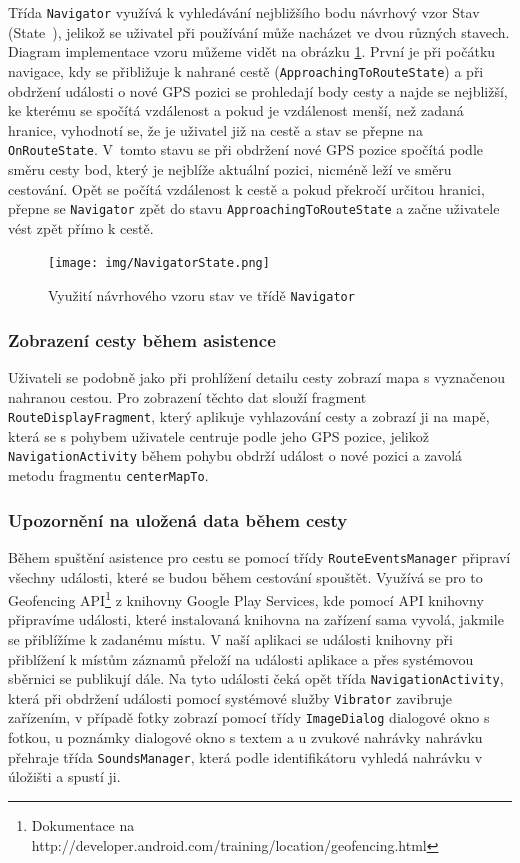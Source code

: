 \documentclass[czech,master,public,dept460,male,java,cpdeclaration]{diploma}
\begin{document}
Třída \texttt{Navigator} využívá k vyhledávání nejbližšího bodu návrhový vzor Stav (State~\cite{designpatterns}), jelikož
se uživatel při používání může nacházet ve dvou různých stavech. Diagram implementace vzoru můžeme vidět
na obrázku \ref{fig:navigatorstate}. První je při počátku navigace,
kdy se přibližuje k nahrané cestě (\texttt{ApproachingToRouteState}) a při obdržení události o nové
GPS pozici se prohledají body cesty a najde se nejbližší, ke kterému se spočítá vzdálenost a pokud
je vzdálenost menší, než zadaná hranice, vyhodnotí se, že je uživatel již na cestě a stav se přepne
na \texttt{OnRouteState}.
V~tomto stavu se při obdržení nové GPS pozice spočítá podle směru cesty bod, který je nejblíže aktuální pozici,
nicméně leží ve směru cestování. Opět se počítá vzdálenost k cestě a pokud překročí určitou hranici,
přepne se \texttt{Navigator} zpět do stavu \texttt{ApproachingToRouteState} a začne uživatele vést zpět přímo k cestě.

\begin{figure}[H]
        \centering
                \texttt{[image: img/NavigatorState.png]}
        \caption{Využití návrhového vzoru stav ve třídě \texttt{Navigator}}
        \label{fig:navigatorstate}
\end{figure}

\subsubsection{Zobrazení cesty během asistence}
Uživateli se podobně jako při prohlížení detailu cesty zobrazí mapa s vyznačenou nahranou cestou.
Pro zobrazení těchto dat slouží fragment \texttt{RouteDisplayFragment}, který aplikuje vyhlazování cesty
a zobrazí ji na mapě, která se s pohybem uživatele centruje podle jeho GPS pozice, jelikož
\texttt{NavigationActivity} během pohybu obdrží událost o nové pozici a zavolá metodu fragmentu \texttt{centerMapTo}.

\subsubsection{Upozornění na uložená data během cesty}
Během spuštění asistence pro cestu se pomocí třídy \texttt{RouteEventsManager} připraví všechny události,
které se budou během cestování spouštět. Využívá se pro to
Geofencing API\footnote{Dokumentace na http://developer.android.com/training/location/geofencing.html}
z knihovny Google Play Services, kde pomocí API knihovny připravíme události, které instalovaná knihovna
na zařízení sama vyvolá, jakmile se přiblížíme k zadanému místu. V naší aplikaci se události knihovny
při přiblížení k místům záznamů přeloží na události aplikace a přes systémovou sběrnici se publikují
dále. Na tyto události čeká opět třída \texttt{NavigationActivity}, která při obdržení události pomocí
systémové služby \texttt{Vibrator} zavibruje zařízením, v případě fotky zobrazí pomocí třídy
\texttt{ImageDialog} dialogové okno s fotkou, u poznámky dialogové okno s textem a u zvukové nahrávky
nahrávku přehraje třída \texttt{SoundsManager}, která podle identifikátoru vyhledá nahrávku v úložišti
a spustí ji.
\end{document}
